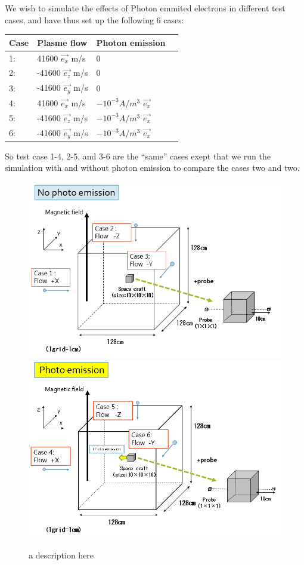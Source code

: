 We wish to simulate the effects of Photon emmited electrons in different test cases, and have thus set up the following
6 cases:
\begin{center}
    \begin{tabular}{ | l | l | l | p{5cm} |}
    \hline
    Case & Plasme flow & Photon emission  \\ \hline
     1: & 41600 $\vec{e_x}$ m/s  & 0 \\ \hline
     2: & -41600 $\vec{e_z}$ m/s & 0 \\ \hline
     3: & -41600 $\vec{e_y}$ m/s & 0 \\ \hline
     4: & 41600 $\vec{e_x}$ m/s & $-10^{-3} A/m^{3}$ $\vec{e_x}$\\ \hline
     5: & -41600 $\vec{e_z}$ m/s & $-10^{-3} A/m^{3}$ $\vec{e_x}$\\ \hline
     6: & -41600 $\vec{e_y}$ m/s & $-10^{-3} A/m^{3}$  $\vec{e_x}$\\
    \hline
    \end{tabular}
\end{center}

So test case 1-4, 2-5, and 3-6 are the ``same'' cases exept that we run the simulation with and without
photon emission to compare the cases two and two. 

\begin{figure}
        \includegraphics[width = 0.4 \textwidth]{images/picture_simulation1.png}
        \includegraphics[width = 0.4 \textwidth]{images/picture_simulation2-2.png}
        \caption{a description here}
    \end{figure}  
